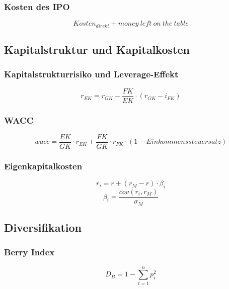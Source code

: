 \subsubsection{Kosten des IPO}
\[Kosten_{direkt} + money~left~on~the~table\]


\subsection{Kapitalstruktur und Kapitalkosten}

\subsubsection{Kapitalstrukturrisiko und Leverage-Effekt}
\[r_{EK} = r_{GK} - \frac{FK}{EK} \cdot (r_{GK} - i_{FK})\]

\subsubsection{WACC}
\[wacc = \frac{EK}{GK} \cdot r_{EK} + \frac{FK}{GK} \cdot r_{FK} \cdot (1-Einkommenssteuersatz)\]

\subsubsection{Eigenkapitalkosten}
\[r_i = r + (r_M - r) \cdot \beta_i\]
\[\beta_i = \frac{cov(r_i, r_M)}{\sigma_M}\]


\subsection{Diversifikation}

\subsubsection{Berry Index}
\[D_B = 1 - \sum_{t=1}^{n} p_i^2\]
